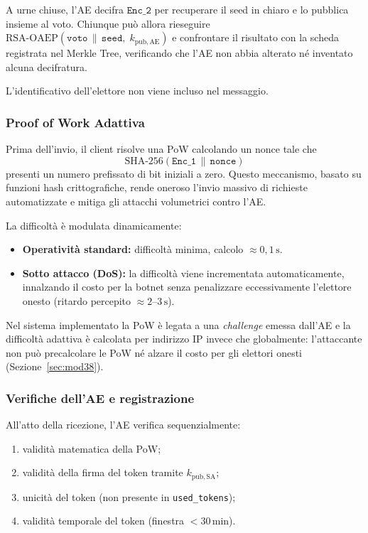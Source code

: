 \documentclass[12pt,a4paper]{article}
\begin{document}
A urne chiuse, l'AE decifra $\mathtt{Enc\_2}$ per recuperare il seed in chiaro e lo pubblica
insieme al voto. Chiunque può allora rieseguire $\mathrm{RSA\text{-}OAEP}(\mathtt{voto} \,\|\,
\mathtt{seed},\; k_{\mathrm{pub,AE}})$ e confrontare il risultato con la scheda registrata nel
Merkle Tree, verificando che l'AE non abbia alterato né inventato alcuna decifratura.

L'identificativo dell'elettore non viene incluso nel messaggio.

\subsubsection{Proof of Work Adattiva}

Prima dell'invio, il client risolve una PoW calcolando un nonce tale che
\begin{equation*}
  \mathrm{SHA\text{-}256}(\mathtt{Enc\_1} \,\|\, \mathtt{nonce})
\end{equation*}
presenti un numero prefissato di bit iniziali a zero. Questo meccanismo, basato su funzioni
hash crittografiche, rende oneroso l'invio massivo di richieste automatizzate e mitiga gli
attacchi volumetrici contro l'AE.

La difficoltà è modulata dinamicamente:
\begin{itemize}
  \item \textbf{Operatività standard:} difficoltà minima, calcolo $\approx 0{,}1\,\mathrm{s}$.
  \item \textbf{Sotto attacco (DoS):} la difficoltà viene incrementata automaticamente,
    innalzando il costo per la botnet senza penalizzare eccessivamente l'elettore onesto
    (ritardo percepito $\approx 2$--$3\,\mathrm{s}$).
\end{itemize}

Nel sistema implementato la PoW è legata a una \emph{challenge} emessa dall'AE e la
difficoltà adattiva è calcolata per indirizzo IP invece che globalmente: l'attaccante non
può precalcolare le PoW né alzare il costo per gli elettori onesti
(Sezione~\ref{sec:mod38}).

\subsubsection{Verifiche dell'AE e registrazione}

All'atto della ricezione, l'AE verifica sequenzialmente:
\begin{enumerate}
  \item validità matematica della PoW;
  \item validità della firma del token tramite $k_{\mathrm{pub,SA}}$;
  \item unicità del token (non presente in \texttt{used\_tokens});
  \item validità temporale del token (finestra $< 30\,\mathrm{min}$).
\end{enumerate}
\end{document}
